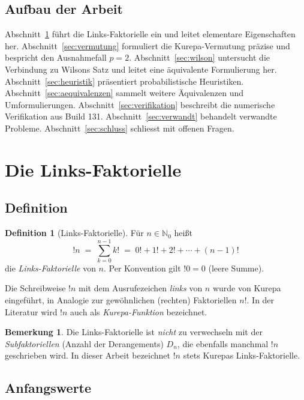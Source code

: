 \documentclass[12pt,a4paper]{amsart}
\theoremstyle{definition}
\newtheorem{definition}[theorem]{Definition}
\newtheorem{bemerkung}[theorem]{Bemerkung}
\newcommand{\N}{\mathbb{N}}
\begin{document}
\subsection*{Aufbau der Arbeit}

Abschnitt~\ref{sec:linksfak} führt die Links-Faktori\-elle ein und leitet
elementare Eigenschaften her.
Abschnitt~\ref{sec:vermutung} formuliert die Kurepa-Vermutung präzise und
bespricht den Ausnahmefall $p = 2$.
Abschnitt~\ref{sec:wilson} untersucht die Verbindung zu Wilsons Satz und
leitet eine äquivalente Formulierung her.
Abschnitt~\ref{sec:heuristik} präsentiert probabilistische Heuristiken.
Abschnitt~\ref{sec:aequivalenzen} sammelt weitere Äquivalenzen und
Umformulierungen.
Abschnitt~\ref{sec:verifikation} beschreibt die numerische Verifikation aus
Build 131.
Abschnitt~\ref{sec:verwandt} behandelt verwandte Probleme.
Abschnitt~\ref{sec:schluss} schliesst mit offenen Fragen.

\section{Die Links-Faktori\-elle}
\label{sec:linksfak}

\subsection{Definition}

\begin{definition}[Links-Faktori\-elle]
Für $n \in \N_0$ heißt
\[
  !n \;=\; \sum_{k=0}^{n-1} k! \;=\; 0! + 1! + 2! + \cdots + (n-1)!
\]
die \emph{Links-Faktori\-elle} von $n$.
Per Konvention gilt $!0 = 0$ (leere Summe).
\end{definition}

Die Schreibweise $!n$ mit dem Ausrufezeichen \emph{links} von $n$ wurde von
Kurepa eingeführt, in Analogie zur gewöhnlichen (rechten) Faktoriellen $n!$.
In der Literatur wird $!n$ auch als \emph{Kurepa-Funktion} bezeichnet.

\begin{bemerkung}
Die Links-Faktori\-elle ist \emph{nicht} zu verwechseln mit der
\emph{Subfaktoriellen} (Anzahl der Derangements) $D_n$,
die ebenfalls manchmal $!n$ geschrieben wird.
In dieser Arbeit bezeichnet $!n$ stets Kurepas Links-Faktori\-elle.
\end{bemerkung}

\subsection{Anfangswerte}
\end{document}
